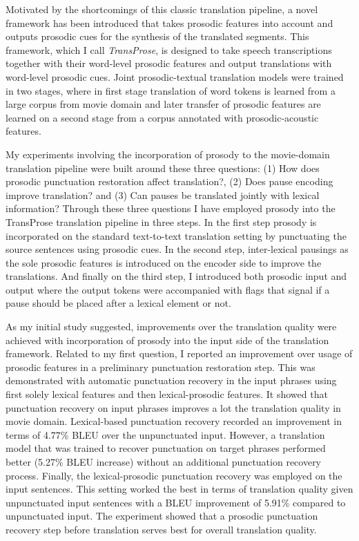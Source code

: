 Motivated by the shortcomings of this classic translation pipeline, a novel framework has been introduced that takes prosodic features into account and outputs prosodic cues for the synthesis of the translated segments. This framework, which I call \textit{TransProse}, is designed to take speech transcriptions together with their word-level prosodic features and output translations with word-level prosodic cues. Joint prosodic-textual translation models were trained in two stages, where in first stage translation of word tokens is learned from a large corpus from movie domain and later transfer of prosodic features are learned on a second stage from a corpus annotated with prosodic-acoustic features.

My experiments involving the incorporation of prosody to the movie-domain translation pipeline were built around these three questions: (1) How does prosodic punctuation restoration affect translation?, (2) Does pause encoding improve translation? and (3) Can pauses be translated jointly with lexical information? Through these three questions I have employed prosody into the TransProse translation pipeline in three steps. In the first step prosody is incorporated on the standard text-to-text translation setting by punctuating the source sentences using prosodic cues. In the second step, inter-lexical pausings as the sole prosodic features is introduced on the encoder side to improve the translations. And finally on the third step, I introduced both prosodic input and output where the output tokens were accompanied with flags that signal if a pause should be placed after a lexical element or not.  

As my initial study suggested, improvements over the translation quality were achieved with incorporation of prosody into the input side of the translation framework. Related to my first question, I reported an improvement over usage of prosodic features in a preliminary punctuation restoration step. This was demonstrated with automatic punctuation recovery in the input phrases using first solely lexical features and then lexical-prosodic features. It showed that punctuation recovery on input phrases improves a lot the translation quality in movie domain. Lexical-based punctuation recovery recorded an improvement in terms of 4.77\% BLEU over the unpunctuated input. However, a translation model that was trained to recover punctuation on target phrases performed better (5.27\% BLEU increase) without an additional punctuation recovery process. Finally, the lexical-prosodic punctuation recovery was employed on the input sentences. This setting worked the best in terms of translation quality given unpunctuated input sentences with a BLEU improvement of 5.91\% compared to unpunctuated input. The experiment showed that a prosodic punctuation recovery step before translation serves best for overall translation quality. 

